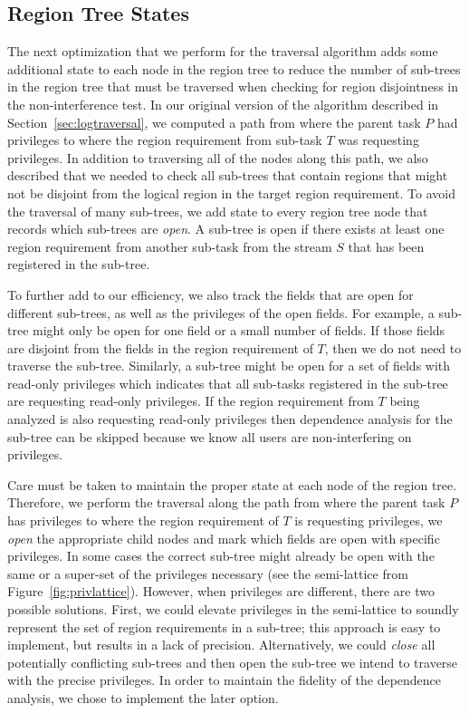 \subsection{Region Tree States}
\label{subsec:logicalstate}
The next optimization that we perform for the
traversal algorithm adds some additional state
to each node in the region tree to 
reduce the number of sub-trees in the region
tree that must be traversed when checking for
region disjointness in the non-interference test.
In our original version of the algorithm described
in Section~\ref{sec:logtraversal}, we computed
a path from where the parent task $P$ had privileges
to where the region requirement from sub-task $T$
was requesting privileges. In addition to traversing
all of the nodes along this path, we also described
that we needed to check all sub-trees that contain
regions that might not be disjoint from the logical
region in the target region requirement. To avoid
the traversal of many sub-trees, we
add state to every region tree node that records
which sub-trees are {\em open}.  A sub-tree is
open if there exists at least one region requirement
from another sub-task from the stream $S$ that has 
been registered in the sub-tree.  

To further add to our efficiency, we also track the 
fields that are open for different sub-trees, as well 
as the privileges of the open fields.  For example, a 
sub-tree might only be open for one field or a small 
number of fields.  If those fields are disjoint from the 
fields in the region requirement of $T$, then we 
do not need to traverse the sub-tree.  Similarly, 
a sub-tree might be open for a set of fields with 
read-only privileges which indicates that all 
sub-tasks registered in the sub-tree are requesting 
read-only privileges. If the region requirement
from $T$ being analyzed is also requesting read-only
privileges then dependence analysis for the sub-tree 
can be skipped because we know all users are 
non-interfering on privileges.

Care must be taken to maintain the proper state at
each node of the region tree.  Therefore, we perform the 
traversal along the path from where the parent task $P$ 
has privileges to where the region requirement of $T$
is requesting privileges, we {\em open} the appropriate
child nodes and mark which fields are open with
specific privileges. In some cases the correct 
sub-tree might already be open with the same or
a super-set of the privileges necessary (see the
semi-lattice from Figure~\ref{fig:privlattice}).
However, when privileges are different, there are
two possible solutions. First, we could elevate
privileges in the semi-lattice to soundly represent
the set of region requirements in a sub-tree; this
approach is easy to implement, but results in a 
lack of precision. Alternatively,
we could {\em close} all potentially conflicting
sub-trees and then open the sub-tree we intend
to traverse with the precise privileges. In order to 
maintain the fidelity of the dependence analysis, we 
chose to implement the later option.

